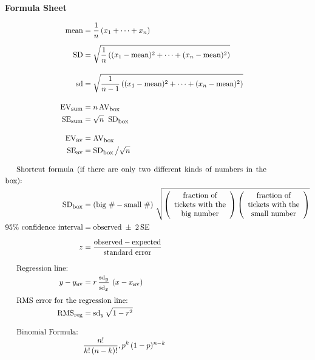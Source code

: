 \documentclass[10pt]{article}
\begin{document}
\begin{center}
\textbf{\large Formula Sheet}
\end{center}\vspace{-15pt}
\begin{align*}
\mbox{mean} &=\frac{1}{n}\left(x_1 + \cdots + x_n\right)\\[5pt]
\mbox{SD}   &=\sqrt{\frac{1}{n}\left( (x_1 - \mbox{mean})^2 + \cdots + (x_n - \mbox{mean})^2\right)}\\[10pt]
\mbox{sd}   &=\sqrt{\frac{1}{n-1}\left( (x_1 - \mbox{mean})^2 + \cdots + (x_n - \mbox{mean})^2\right)}\\[10pt]
%
\mbox{EV}_{\mbox{\footnotesize sum}} & = n\,\mbox{AV}_{\mbox{\footnotesize box}}\\
\mbox{SE}_{\mbox{\footnotesize sum}} & = \sqrt{n}\;\;\mbox{SD}_{\mbox{\footnotesize box}}\\[10pt]
%
\mbox{EV}_{\mbox{\footnotesize av}} & = \mbox{AV}_{\mbox{\footnotesize box}}\\
\mbox{SE}_{\mbox{\footnotesize av}} & = \mbox{SD}_{\mbox{\footnotesize box}}\,\big{/}\sqrt{n}\\[10pt]
%
%
\noalign{Shortcut formula (if there are only two different kinds of numbers in the box):}
\mbox{SD}_{\mbox{\footnotesize box}} &=
  \left(\mbox{big \#} - \mbox{small \#}\right)\,\sqrt{
  \left(\begin{array}{c}\mbox{fraction of}\\ \mbox{tickets with the}\\ \mbox{big number}\end{array}\right)
  \left(\begin{array}{c}\mbox{fraction of}\\\mbox{tickets with the}\\\mbox{small number}\end{array}\right)}\\
%
\mbox{95\% confidence interval} &= \mbox{observed} \;\pm\; 2\,\mbox{SE}\\[5pt]
z &= \frac{\mbox{observed} - \mbox{expected}}{\mbox{standard error}}\\[10pt]
%
\noalign{Regression line:}
y - y_{\mbox{\footnotesize av}} &= r\,\frac{\mbox{\footnotesize sd}_y}{\mbox{\footnotesize sd}_x}\,
       \left(x - x_{\mbox{\footnotesize av}}\right)\\[5pt]
\noalign{RMS error for the regression line:}
\mbox{RMS}_{\mbox{\footnotesize reg}} &= \mbox{sd}_y\,\sqrt{1 - r^2}\\[10pt]
\noalign{Binomial Formula:}
&{} \frac{n!}{k!\,(n-k)!},p^k\,(1-p)^{n-k}
\end{align*}

\vfill
\eject
\end{document}
